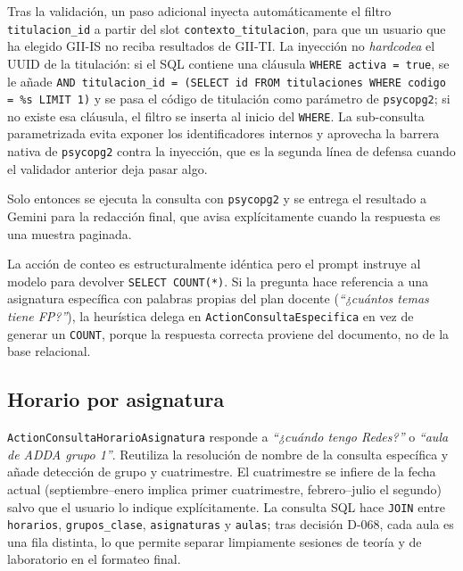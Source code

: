 Tras la validación, un paso adicional inyecta automáticamente el filtro \texttt{titulacion\_id} a partir del slot \texttt{contexto\_titulacion}, para que un usuario que ha elegido GII-IS no reciba resultados de GII-TI. La inyección no \textit{hardcodea} el UUID de la titulación: si el SQL contiene una cláusula \texttt{WHERE activa = true}, se le añade \texttt{AND titulacion\_id = (SELECT id FROM titulaciones WHERE codigo = \%s LIMIT 1)} y se pasa el código de titulación como parámetro de \texttt{psycopg2}; si no existe esa cláusula, el filtro se inserta al inicio del \texttt{WHERE}. La sub-consulta parametrizada evita exponer los identificadores internos y aprovecha la barrera nativa de \texttt{psycopg2} contra la inyección, que es la segunda línea de defensa cuando el validador anterior deja pasar algo.

Solo entonces se ejecuta la consulta con \texttt{psycopg2} y se entrega el resultado a Gemini para la redacción final, que avisa explícitamente cuando la respuesta es una muestra paginada.

La acción de conteo es estructuralmente idéntica pero el prompt instruye al modelo para devolver \texttt{SELECT COUNT(*)}. Si la pregunta hace referencia a una asignatura específica con palabras propias del plan docente (\textit{``¿cuántos temas tiene FP?''}), la heurística delega en \texttt{ActionConsultaEspecifica} en vez de generar un \texttt{COUNT}, porque la respuesta correcta proviene del documento, no de la base relacional.

\subsection{Horario por asignatura}

\texttt{ActionConsultaHorarioAsignatura} responde a \textit{``¿cuándo tengo Redes?''} o \textit{``aula de ADDA grupo 1''}. Reutiliza la resolución de nombre de la consulta específica y añade detección de grupo y cuatrimestre. El cuatrimestre se infiere de la fecha actual (septiembre--enero implica primer cuatrimestre, febrero--julio el segundo) salvo que el usuario lo indique explícitamente. La consulta SQL hace \texttt{JOIN} entre \texttt{horarios}, \texttt{grupos\_clase}, \texttt{asignaturas} y \texttt{aulas}; tras decisión D-068, cada aula es una fila distinta, lo que permite separar limpiamente sesiones de teoría y de laboratorio en el formateo final.


